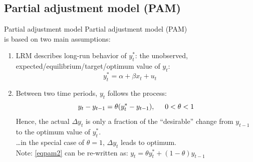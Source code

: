 \documentclass{beamer}
\begin{document}
\subsection{Partial adjustment model (PAM)}
\begin{frame}{Partial adjustment model}
Partial adjustment model (PAM) \\is based on two main assumptions:
\begin{enumerate}
\item LRM describes long-run behavior of $y_t^{\ast}$: the unobserved, expected/equilibrium/target/optimum value of $y_t$:
\begin{equation}
{y}_t^\ast = \alpha + \beta x_t + u_t  ~~~~~~~~  \label{eqpam1} 
\end{equation}
\item Between two time periods, $y_t$ follows the process:
\begin{equation}
y_t - y_{t-1} = \theta ( y_t^\ast-y_{t-1}), \hspace{0.5cm} 0 < \theta < 1 \label{eqpam2}
\end{equation}
Hence, the actual $\Delta y_t$ is only a fraction of the ``desirable'' change from $y_{t-1}$ to the optimum value of $y_t^\ast$.
\\ \dots in the special case of $\theta = 1$, $\Delta y_t$ leads to optimum.\\
\medskip
Note: \eqref{eqpam2} can be re-written as: $y_t= \theta {y}_t^\ast + (1-\theta)y_{t-1} $
\end{enumerate}
\end{frame}
\end{document}
